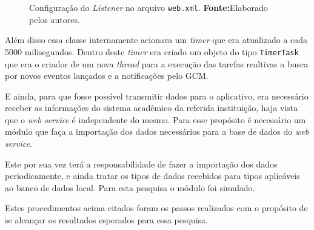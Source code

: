	\begin{figure}[h!]
		
		\caption[Configuração do  Listener no arquivo web.xml]{Configuração do 
		\textit{Listener} no arquivo \texttt{web.xml}.
		\textbf{Fonte:}Elaborado pelos autores.}
		\label{fig:desws34}
	\end{figure}
	
	\par Além disso essa classe internamente acionava um \textit{timer} que era
atualizado a cada 5000 milisegundos. Dentro deste \textit{timer} era criado um
objeto do tipo \texttt{TimerTask} que era o criador de um nova \textit{thread}
para a execução das tarefas realtivas a busca por novos eventos lançados e a
notificações pelo GCM.
	
	\par E ainda, para que fosse possível transmitir dados para o aplicativo, era
necessário receber as informações do sistema acadêmico da referida instituição,
haja vista que o \textit{web service} é independente do mesmo. Para esse
propósito é necessário um módulo que faça a importação dos dados necessários
para a base de dados do \textit{web service}.

	\par Este por sua vez terá a responsabilidade de fazer a importação dos dados
periodicamente, e ainda tratar os tipos de dados recebidos para tipos
aplicáveis ao banco de dados local. Para esta pesquisa o módulo foi simulado.

	\par Estes procedimentos acima citados foram os passos realizados com o
propósito de se alcançar os resultados esperados para essa pesquisa. 